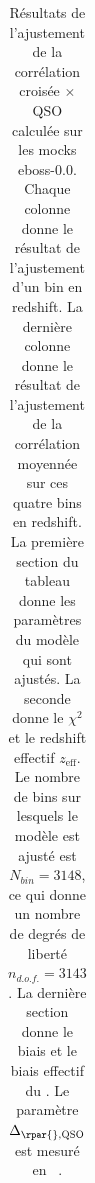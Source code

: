 \begin{table}[h]
  \centering
  \caption{Résultats de l'ajustement de la corrélation croisée \lya{}$\times$QSO calculée sur les mocks eboss-0.0. Chaque colonne donne le résultat de l'ajustement d'un bin en redshift. La dernière colonne donne le résultat de l'ajustement de la corrélation moyennée sur ces quatre bins en redshift. La première section du tableau donne les paramètres du modèle qui sont ajustés. La seconde donne le $\chi^2$ et le redshift effectif $z_{\mathrm{eff}}$. Le nombre de bins sur lesquels le modèle est ajusté est $N_{bin} = \num{3148}$, ce qui donne un nombre de degrés de liberté $n_{d.o.f.} = \num{3143}$. La dernière section donne le biais et le biais effectif du \lya{}. Le paramètre $\Delta_{\rpar{}, \textsc{QSO}}$ est mesuré en \si{\perh\Mpc}.}
  \label{tab:xcf_eboss00_4bins}
  \footnotesize
  \begin{tabular}{lccccc}

\end{tabular}
\end{table}
